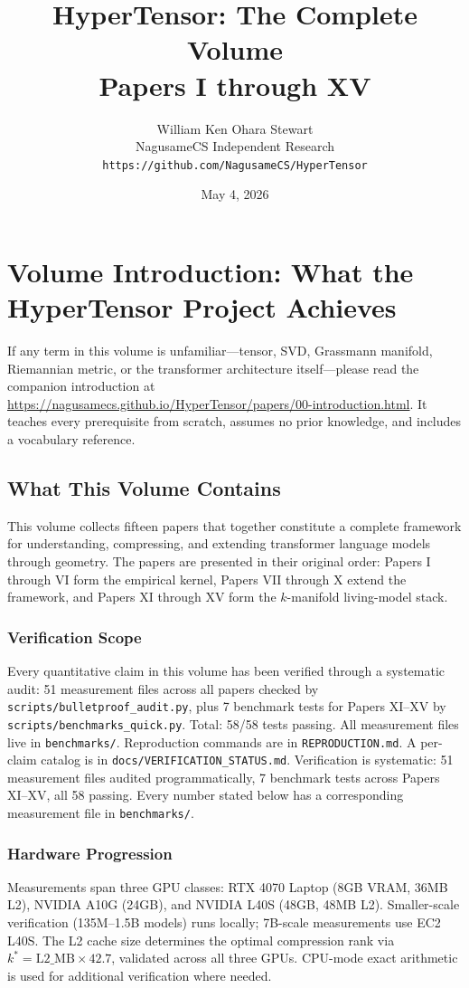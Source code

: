 \documentclass[11pt]{article}
\title{HyperTensor: The Complete Volume\\\large Papers I through XV}
\author{William Ken Ohara Stewart\\NagusameCS Independent Research\\\texttt{https://github.com/NagusameCS/HyperTensor}}
\date{May 4, 2026}
\begin{document}
\maketitle

\section*{Volume Introduction: What the HyperTensor Project Achieves}

If any term in this volume is unfamiliar---tensor, SVD, Grassmann manifold, Riemannian metric, or the transformer architecture itself---please read the companion introduction at \url{https://nagusamecs.github.io/HyperTensor/papers/00-introduction.html}. It teaches every prerequisite from scratch, assumes no prior knowledge, and includes a vocabulary reference.

\subsection*{What This Volume Contains}

This volume collects fifteen papers that together constitute a complete framework for understanding, compressing, and extending transformer language models through geometry. The papers are presented in their original order: Papers I through VI form the empirical kernel, Papers VII through X extend the framework, and Papers XI through XV form the $k$-manifold living-model stack.

\subsubsection*{Verification Scope}
Every quantitative claim in this volume has been verified through a systematic audit: 51 measurement files across all papers checked by \texttt{scripts/bulletproof\_audit.py}, plus 7 benchmark tests for Papers XI--XV by \texttt{scripts/benchmarks\_quick.py}. Total: 58/58 tests passing. All measurement files live in \texttt{benchmarks/}. Reproduction commands are in \texttt{REPRODUCTION.md}. A per-claim catalog is in \texttt{docs/VERIFICATION\_STATUS.md}. Verification is systematic: 51 measurement files audited programmatically, 7 benchmark tests across Papers XI--XV, all 58 passing. Every number stated below has a corresponding measurement file in \texttt{benchmarks/}.

\subsubsection*{Hardware Progression}
Measurements span three GPU classes: RTX 4070 Laptop (8GB VRAM, 36MB L2), NVIDIA A10G (24GB), and NVIDIA L40S (48GB, 48MB L2). Smaller-scale verification (135M--1.5B models) runs locally; 7B-scale measurements use EC2 L40S. The L2 cache size determines the optimal compression rank via $k^* = \mathrm{L2\_MB} \times 42.7$, validated across all three GPUs. CPU-mode exact arithmetic is used for additional verification where needed.
\end{document}
